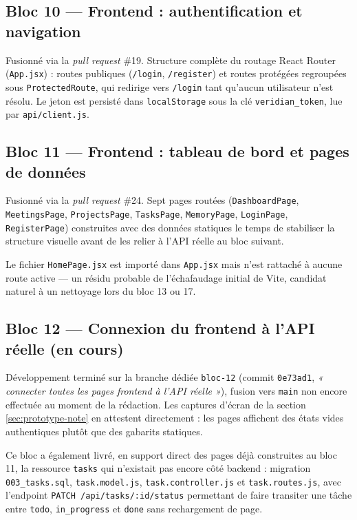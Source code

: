 \documentclass[12pt, a4paper]{article}
\begin{document}
\subsection{Bloc 10 — Frontend : authentification et navigation}

Fusionné via la \textit{pull request} \#19. Structure complète du routage React Router (\texttt{App.jsx}) : routes publiques (\texttt{/login}, \texttt{/register}) et routes protégées regroupées sous \texttt{ProtectedRoute}, qui redirige vers \texttt{/login} tant qu'aucun utilisateur n'est résolu. Le jeton est persisté dans \texttt{localStorage} sous la clé \texttt{veridian\_token}, lue par \texttt{api/client.js}.

\subsection{Bloc 11 — Frontend : tableau de bord et pages de données}

Fusionné via la \textit{pull request} \#24. Sept pages routées (\texttt{DashboardPage}, \texttt{MeetingsPage}, \texttt{ProjectsPage}, \texttt{TasksPage}, \texttt{MemoryPage}, \texttt{LoginPage}, \texttt{RegisterPage}) construites avec des données statiques le temps de stabiliser la structure visuelle avant de les relier à l'API réelle au bloc suivant.

\begin{infobox}
  Le fichier \texttt{HomePage.jsx} est importé dans \texttt{App.jsx} mais n'est rattaché à aucune route active — un résidu probable de l'échafaudage initial de Vite, candidat naturel à un nettoyage lors du bloc 13 ou 17.
\end{infobox}

\subsection{Bloc 12 — Connexion du frontend à l'API réelle (en cours)}

Développement terminé sur la branche dédiée \texttt{bloc-12} (commit \texttt{0e73ad1}, \textit{« connecter toutes les pages frontend à l'API réelle »}), fusion vers \texttt{main} non encore effectuée au moment de la rédaction. Les captures d'écran de la section \ref{sec:prototype-note} en attestent directement : les pages affichent des états vides authentiques plutôt que des gabarits statiques.

Ce bloc a également livré, en support direct des pages déjà construites au bloc 11, la ressource \texttt{tasks} qui n'existait pas encore côté backend : migration \texttt{003\_tasks.sql}, \texttt{task.model.js}, \texttt{task.controller.js} et \texttt{task.routes.js}, avec l'endpoint \texttt{PATCH /api/tasks/:id/status} permettant de faire transiter une tâche entre \texttt{todo}, \texttt{in\_progress} et \texttt{done} sans rechargement de page.
\end{document}
